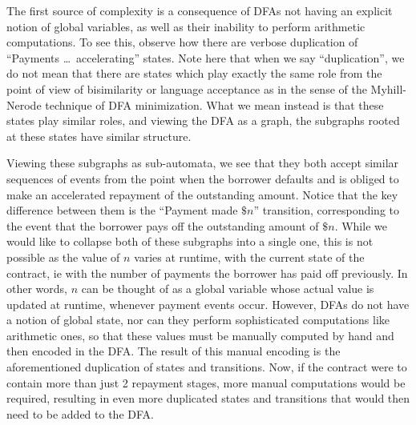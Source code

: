 \documentclass{article}
\begin{document}
The first source of complexity is a consequence of DFAs not having an explicit
notion of global variables, as well as their inability to
perform arithmetic computations.
To see this, observe how there are verbose duplication of
``Payments \dots \, accelerating'' states.
Note here that when we say ``duplication'', we do not mean that there are states
which play exactly the same role from the point of view of bisimilarity or
language acceptance as in the sense of the Myhill-Nerode technique of DFA
minimization.
What we mean instead is that these states play similar roles, and viewing the
DFA as a graph, the subgraphs rooted at these states have similar structure.

Viewing these subgraphs as sub-automata, we see that they both accept
similar sequences of events from the point when the borrower defaults and is
obliged to make an accelerated repayment of the outstanding amount.
Notice that the key difference between them is the ``Payment made $\$n$''
transition, corresponding to the event that the borrower pays off the
outstanding amount of $\$n$.
While we would like to collapse both of these subgraphs into a single one,
this is not possible as the value of $n$ varies at runtime, with the current
state of the contract, ie with the number of payments the borrower has paid off
previously.
In other words, $n$ can be thought of as a global variable whose actual value
is updated at runtime, whenever payment events occur.
However, DFAs do not have a notion of global state, nor can they perform
sophisticated computations like arithmetic ones, so that these values must
be manually computed by hand and then encoded in the DFA.
The result of this manual encoding is the aforementioned duplication of states
and transitions.
Now, if the contract were to contain more than just 2 repayment stages, more
manual computations would be required, resulting in even more duplicated states
and transitions that would then need to be added to the DFA.



\end{document}
